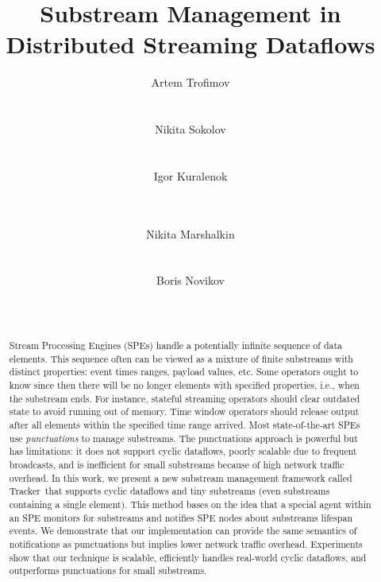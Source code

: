 \documentclass{vldb}
\newcommand {\tracker} {Tracker}
\begin{document}
\title {Substream Management in Distributed Streaming Dataflows}


\author{
\alignauthor
Artem Trofimov\\
    \\
    \\
\alignauthor
Nikita Sokolov\\
    \\
    \\
\alignauthor
Igor Kuralenok\\
    \\
    \\
\and 
\alignauthor
Nikita Marshalkin\\
    \\
    \\
\alignauthor
Boris Novikov\\
    \\
    \\
}

\maketitle

\begin{abstract}
Stream Processing Engines (SPEs) handle a potentially infinite sequence of data elements. This sequence often can be viewed as a mixture of finite substreams with distinct properties: event times ranges, payload values, etc. Some operators ought to know since then there will be no longer elements with specified properties, i.e., when the substream ends. For instance, stateful streaming operators should clear outdated state to avoid running out of memory. Time window operators should release output after all elements within the specified time range arrived. Most state-of-the-art SPEs use {\em punctuations} to manage substreams. The punctuations approach is powerful but has limitations: it does not support cyclic dataflows, poorly scalable due to frequent broadcasts, and is inefficient for small substreams because of high network traffic overhead. In this work, we present a new substream management framework called \tracker\ that supports cyclic dataflows and tiny substreams (even substreams containing a single element). This method bases on the idea that a special agent within an SPE monitors for substreams and notifies SPE nodes about substreams lifespan events. We demonstrate that our implementation can provide the same semantics of notifications as punctuations but implies lower network traffic overhead. Experiments show that our technique is scalable, efficiently handles real-world cyclic dataflows, and outperforms punctuations for small substreams.
\end{abstract}
\end{document}

